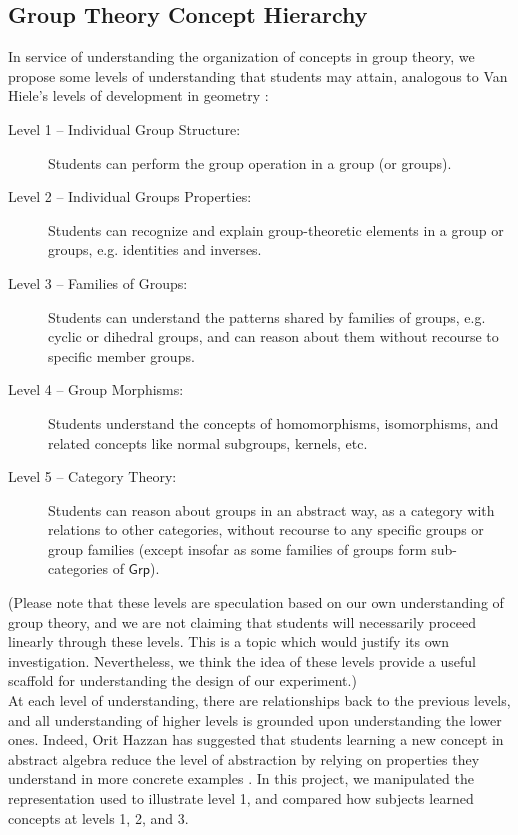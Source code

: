 \documentclass[11pt]{article}
\begin{document}
\subsection{Group Theory Concept Hierarchy}
In service of understanding the organization of concepts in group theory, we propose some levels of understanding that students may attain, analogous to Van Hiele's levels of development in geometry \cite{Burger1986}:
\begin{description}
\item[Level 1 -- Individual Group Structure:] Students can perform the group operation in a group (or groups).
\item[Level 2 -- Individual Groups Properties:] Students can recognize and explain group-theoretic elements in a group or groups, e.g. identities and inverses.
\item[Level 3 -- Families of Groups:] Students can understand the patterns shared by families of groups, e.g. cyclic or dihedral groups, and can reason about them without recourse to specific member groups.
\item[Level 4 -- Group Morphisms:] Students understand the concepts of homomorphisms, isomorphisms, and related concepts like normal subgroups, kernels, etc.
\item[Level 5 -- Category Theory:] Students can reason about groups in an abstract way, as a category with relations to other categories, without recourse to any specific groups or group families (except insofar as some families of groups form sub-categories of $\mathsf{Grp}$).
\end{description}
(Please note that these levels are speculation based on our own understanding of group theory, and we are not claiming that students will necessarily proceed linearly through these levels. This is a topic which would justify its own investigation. Nevertheless, we think the idea of these levels provide a useful scaffold for understanding the design of our experiment.) \\[11pt]
At each level of understanding, there are relationships back to the previous levels, and all understanding of higher levels is grounded upon understanding the lower ones. Indeed, Orit Hazzan has suggested that students learning a new concept in abstract algebra reduce the level of abstraction by relying on properties they understand in more concrete examples \cite{Hazzan1999}. In this project, we manipulated the representation used to illustrate level 1, and compared how subjects learned concepts at levels 1, 2, and 3. 
\end{document}
